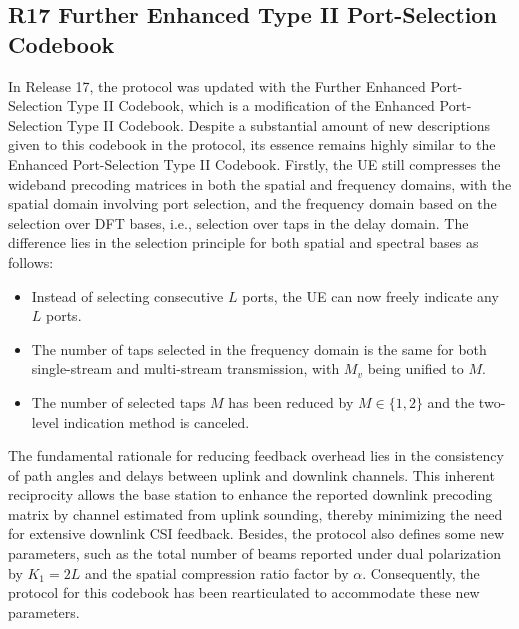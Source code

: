 \documentclass[lettersize,journal]{IEEEtran}
\begin{document}
\subsection{R17 Further Enhanced Type II Port-Selection Codebook}
In Release 17, the protocol was updated with the Further Enhanced Port-Selection Type II Codebook, which is a modification of the Enhanced Port-Selection Type II Codebook. Despite a substantial amount of new descriptions given to this codebook in the protocol, its essence remains highly similar to the Enhanced Port-Selection Type II Codebook. Firstly, the UE still compresses the wideband precoding matrices in both the spatial and frequency domains, with the spatial domain involving port selection, and the frequency domain based on the selection over DFT bases, i.e., selection over taps in the delay domain. The difference lies in the selection principle for both spatial and spectral bases as follows:
\begin{itemize}
    \item Instead of selecting consecutive $L$ ports, the UE can now freely indicate any $L$ ports. 
    \item The number of taps selected in the frequency domain is the same for both single-stream and multi-stream transmission, with $M_v$ being unified to $M$. 
     \item The number of selected taps $M$ has been reduced by $M \in \{1,2\}$ and the two-level indication method is canceled.
\end{itemize}
The fundamental rationale for reducing feedback overhead lies in the consistency of path angles and delays between uplink and downlink channels. This inherent reciprocity allows the base station to enhance the reported downlink precoding matrix by channel estimated from uplink sounding, thereby minimizing the need for extensive downlink CSI feedback. Besides, the protocol also defines some new parameters, such as the total number of beams reported under dual polarization by $K_1=2L$ and the spatial compression ratio factor by $\alpha$. Consequently, the protocol for this codebook has been rearticulated to accommodate these new parameters.
\end{document}
